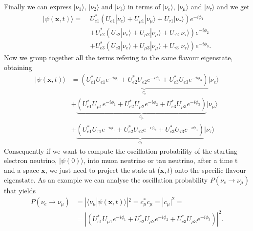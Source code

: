 Finally we can express $| \nu_1 \rangle$, $| \nu_2 \rangle$ and $| \nu_3 \rangle$ in terms of $| \nu_e \rangle$, $| \nu_\mu \rangle$ and 
$| \nu_\tau \rangle$ and we get
\begin{equation*}
    \begin{aligned}
        | \psi(\mathbf{x}, t) \rangle = \;& U_{e1}^* (U_{e1} | \nu_e \rangle + U_{\mu 1} | \nu_\mu \rangle + U_{\tau 1} | \nu_\tau \rangle) e^{-i\phi_1} \\
        &+ U_{e2}^* (U_{e2} | \nu_e \rangle + U_{\mu 2} | \nu_\mu \rangle + U_{\tau 2} | \nu_\tau \rangle) e^{-i\phi_2} \\
        &+ U_{e3}^* (U_{e3} | \nu_e \rangle + U_{\mu 3} | \nu_\mu \rangle + U_{\tau 3} | \nu_\tau \rangle) e^{-i\phi_3}.
    \end{aligned}
\end{equation*}
Now we group together all the terms refering to the same flavour eigenstate, obtaining
\begin{equation}
    \label{eq:evolved-state}
    \begin{aligned}
        | \psi(\mathbf{x}, t) \rangle &= \underbrace{(U_{e1}^* U_{e1} e^{-i\phi_1} + U_{e2}^* U_{e2} e^{-i\phi_2} + U_{e3}^* U_{e3} e^{-i\phi_3})}_{c_e} | \nu_e \rangle \\
        &+ \underbrace{(U_{e1}^* U_{\mu 1} e^{-i\phi_1} + U_{e2}^* U_{\mu 2} e^{-i\phi_2} + U_{e3}^* U_{\mu 3} e^{-i\phi_3})}_{c_\mu} | \nu_\mu \rangle \\
        &+ \underbrace{(U_{e1}^* U_{\tau 1} e^{-i\phi_1} + U_{e2}^* U_{\tau 2} e^{-i\phi_2} + U_{e3}^* U_{\tau 3} e^{-i\phi_3})}_{c_\tau} | \nu_\tau \rangle
    \end{aligned}
\end{equation}
Consequently if we want to compute the oscillation probability of the starting electron neutrino, $| \psi(0) \rangle$, into muon neutrino or tau neutrino,
after a time t and a space $\mathbf{x}$, we just need to project the state at ($\mathbf{x}, t$) onto the specific flavour eigenstate. 
As an example we can analyse the oscillation probability $P(\nu_{e} \rightarrow \nu_\mu)$ that yields
\begin{equation}
    \label{eq:oscillation-prob}
    \begin{aligned}
        P(\nu_{e} \rightarrow \nu_\mu) &= | \langle \nu_\mu | \psi(\mathbf{x}, t) \rangle|^2 = c_\mu^* c_\mu = |c_\mu|^2 = \\
                    &= \left|(U_{e1}^* U_{\mu 1} e^{-i\phi_1} + U_{e2}^* U_{\mu 2} e^{-i\phi_2} + U_{e3}^* U_{\mu 3} e^{-i\phi_3})\right|^2.
    \end{aligned}
\end{equation}
